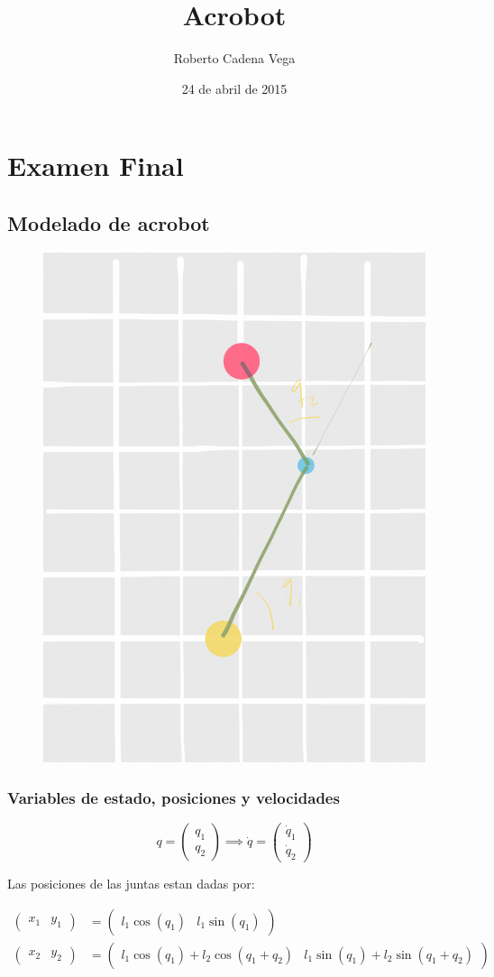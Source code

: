 \documentclass{article}
\title{Acrobot}
\author{Roberto Cadena Vega}
\date{24 de abril de 2015}
\begin{document}
    
    
    \maketitle
    
    \section*{Examen Final}\label{examen-final}

    \subsection*{Modelado de acrobot}\label{modelado-de-acrobot}

    \begin{figure}[htbp]
\centering
\includegraphics[width = 0.3\linewidth]{./imagenes/doblependulo.PNG}
\end{figure}

    \subsubsection*{Variables de estado, posiciones y
velocidades}\label{variables-de-estado-posiciones-y-velocidades}

    \[
q = 
\begin{pmatrix}
q_1 \\
q_2
\end{pmatrix} \implies
\dot{q} =
\begin{pmatrix}
\dot{q}_1 \\
\dot{q}_2
\end{pmatrix}
\]

Las posiciones de las juntas estan dadas por:

\[
\begin{align}
\begin{pmatrix}
x_1 & y_1
\end{pmatrix} &= 
\begin{pmatrix}
l_1 \cos{(q_1)} & l_1 \sin{(q_1)}
\end{pmatrix} \\
\begin{pmatrix}
x_2 & y_2
\end{pmatrix} &= 
\begin{pmatrix}
l_1 \cos{(q_1)} + l_2 \cos{(q_1 + q_2)} & l_1 \sin{(q_1)} + l_2 \sin{(q_1 + q_2)}
\end{pmatrix}
\end{align}
\]
\end{document}
